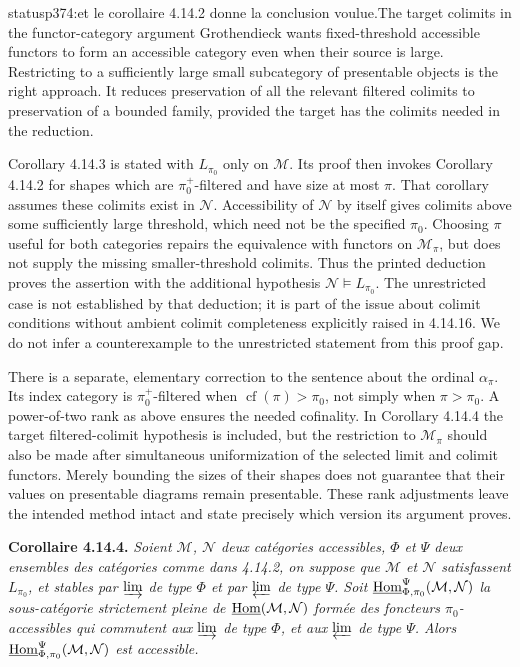 \begin{dcomment}{status}{p374:et le corollaire 4.14.2 donne la conclusion voulue.}{The target colimits in the functor-category argument}
Grothendieck wants fixed-threshold accessible functors to form an accessible category even when their source is large. Restricting to a sufficiently large small subcategory of presentable objects is the right approach. It reduces preservation of all the relevant filtered colimits to preservation of a bounded family, provided the target has the colimits needed in the reduction.

Corollary 4.14.3 is stated with $L_{\pi_0}$ only on $\mathcal M$. Its proof then invokes Corollary 4.14.2 for shapes which are $\pi_0^+$-filtered and have size at most $\pi$. That corollary assumes these colimits exist in $\mathcal N$. Accessibility of $\mathcal N$ by itself gives colimits above some sufficiently large threshold, which need not be the specified $\pi_0$. Choosing $\pi$ useful for both categories repairs the equivalence with functors on $\mathcal M_\pi$, but does not supply the missing smaller-threshold colimits. Thus the printed deduction proves the assertion with the additional hypothesis $\mathcal N\models L_{\pi_0}$. The unrestricted case is not established by that deduction; it is part of the issue about colimit conditions without ambient colimit completeness explicitly raised in 4.14.16. We do not infer a counterexample to the unrestricted statement from this proof gap.

There is a separate, elementary correction to the sentence about the ordinal $\alpha_\pi$. Its index category is $\pi_0^+$-filtered when $\operatorname{cf}(\pi)>\pi_0$, not simply when $\pi>\pi_0$. A power-of-two rank as above ensures the needed cofinality. In Corollary 4.14.4 the target filtered-colimit hypothesis is included, but the restriction to $\mathcal M_\pi$ should also be made after simultaneous uniformization of the selected limit and colimit functors. Merely bounding the sizes of their shapes does not guarantee that their values on presentable diagrams remain presentable. These rank adjustments leave the intended method intact and state precisely which version its argument proves.
\end{dcomment}


\noindent\textbf{Corollaire 4.14.4.} {\itshape Soient $\mathcal{M}$, $\mathcal{N}$ deux catégories accessibles, $\Phi$ et $\Psi$ deux ensembles des catégories comme dans 4.14.2, on suppose que $\mathcal{M}$ et $\mathcal{N}$ satisfassent $L_{\pi_0}$, et stables par $\varinjlim$ de type $\Phi$ et par $\varprojlim$ de type $\Psi$. Soit $\underline{\mathrm{Hom}}^{\Psi}_{\Phi,\pi_0}(\mathcal{M},\mathcal{N})$ la sous-catégorie strictement pleine de $\underline{\mathrm{Hom}}(\mathcal{M},\mathcal{N})$ formée des foncteurs $\pi_0$-accessibles qui commutent aux $\varinjlim$ de type $\Phi$, et aux $\varprojlim$ de type $\Psi$. Alors $\underline{\mathrm{Hom}}^{\Psi}_{\Phi,\pi_0}(\mathcal{M},\mathcal{N})$ est accessible.}

